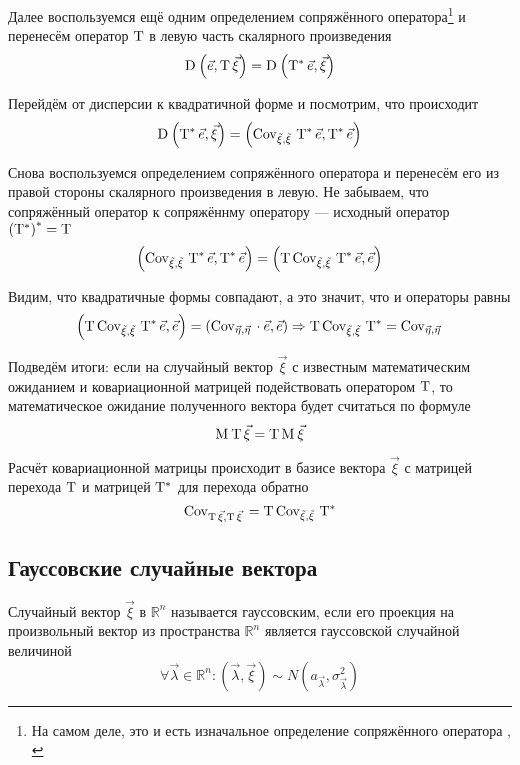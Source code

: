 Далее воспользуемся ещё одним определением сопряжённого оператора\footnote{На
самом деле, это и есть изначальное определение сопряжённого оператора
\cite[с.~241]{VoevodinLA}, \cite[с.~126]{IlinPoznyarLA}}
и перенесём оператор $\mathrm{T}$ в левую часть скалярного произведения
$$\mathrm{D}_{} \left( \vec{e}, \mathrm{T}\, {\vec{\xi}} \right)
    = \mathrm{D}_{} \left( \mathrm{T^*}\, {\vec{e}}, \vec{\xi} \right)$$

Перейдём от дисперсии к квадратичной форме и посмотрим, что происходит
$$\mathrm{D}_{} \left( \mathrm{T^*}\, {\vec{e}}, \vec{\xi} \right)
    = \left( \mathrm{\mathrm{Cov}_{\vec{\xi}, \vec{\xi}}\,}\, {\mathrm{T^*}\, {\vec{e}}},
        \mathrm{T^*}\, {\vec{e}} \right)$$

Снова воспользуемся определением сопряжённого оператора и перенесём его
из правой стороны скалярного произведения в левую. Не забываем, что
сопряжённый оператор к сопряжённму оператору --- исходный оператор
$\left( \mathrm{T^*} \right)^* = \mathrm{T}$
$$\left( \mathrm{\mathrm{Cov}_{\vec{\xi}, \vec{\xi}}\,}\, {\mathrm{T^*}\, {\vec{e}}},
        \mathrm{T^*}\, {\vec{e}} \right)
    = \left( \mathrm{T}\, {
            \mathrm{\mathrm{Cov}_{\vec{\xi}, \vec{\xi}}\,}\, {\mathrm{T^*}\, {\vec{e}}}},
        \vec{e} \right)$$

Видим, что квадратичные формы совпадают, а это значит, что и операторы равны
$$\left( \mathrm{T}\, {
    \mathrm{\mathrm{Cov}_{\vec{\xi}, \vec{\xi}}\,}\, {\mathrm{T^*}\, {\vec{e}}}}, \vec{e} \right)
        = \left( \mathrm{Cov}_{\vec{\eta}, \vec{\eta}}\, \cdot \vec{e}, \vec{e} \right)
    \Rightarrow
    \mathrm{T}\, {\mathrm{\mathrm{Cov}_{\vec{\xi}, \vec{\xi}}\,}\, {\mathrm{T^*}}}
        = \mathrm{Cov}_{\vec{\eta}, \vec{\eta}}\,$$

Подведём итоги: если на случайный вектор $\vec{\xi}$ с известным математическим
ожиданием и ковариационной матрицей подействовать оператором $\mathrm{T}$,
то математическое ожидание полученного вектора будет считаться по формуле
$$\mathrm{M}_{}\,\mathrm{T}\, {\vec{\xi}} = \mathrm{T}\, {\mathrm{M}_{}\,\vec{\xi}}$$

Расчёт ковариационной матрицы происходит в базисе вектора $\vec{\xi}$
с матрицей перехода $\mathrm{T}$ и матрицей $\mathrm{T^*}$
для перехода обратно
$$\mathrm{Cov}_{\mathrm{T}\, {\vec{\xi}}, \mathrm{T}\, {\vec{\xi}}}\,
    = \mathrm{T}\, {\mathrm{\mathrm{Cov}_{\vec{\xi}, \vec{\xi}}\,}\, {\mathrm{T^*}}}$$

\subsection{Гауссовские случайные вектора}

\begin{definition}
    \label{def:gaussianVector}
    Случайный вектор $\vec{\xi}$ в $\mathbb{R}^n$ называется гауссовским, если
    его проекция на произвольный вектор из пространства $\mathbb{R}^n$
    является гауссовской случайной величиной
    $$\forall \vec{\lambda} \in \mathbb{R}^n:
        \left( \vec{\lambda}, \vec{\xi} \right)
            \sim N\left( a_{\vec{\lambda}}, \sigma_{\vec{\lambda}}^2 \right)$$
\end{definition}

